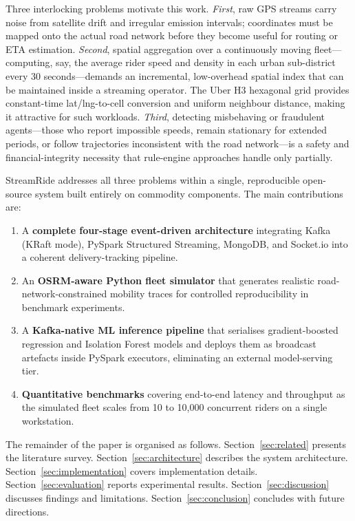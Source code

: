 \documentclass[conference]{IEEEtran}
\begin{document}
Three interlocking problems motivate this work. \textit{First},
raw GPS streams carry noise from satellite drift and irregular
emission intervals; coordinates must be mapped onto the actual road
network before they become useful for routing or ETA estimation.
\textit{Second}, spatial aggregation over a continuously moving
fleet—computing, say, the average rider speed and density in each
urban sub-district every 30 seconds—demands an incremental,
low-overhead spatial index that can be maintained inside a
streaming operator. The Uber H3 hexagonal grid provides constant-time
lat/lng-to-cell conversion and uniform neighbour distance, making
it attractive for such workloads. \textit{Third}, detecting
misbehaving or fraudulent agents—those who report impossible
speeds, remain stationary for extended periods, or follow
trajectories inconsistent with the road network—is a safety and
financial-integrity necessity that rule-engine approaches handle
only partially.

StreamRide addresses all three problems within a single, reproducible
open-source system built entirely on commodity components. The main
contributions are:

\begin{enumerate}
  \item A \textbf{complete four-stage event-driven architecture}
        integrating Kafka (KRaft mode), PySpark Structured Streaming,
        MongoDB, and Socket.io into a coherent delivery-tracking pipeline.
  \item An \textbf{OSRM-aware Python fleet simulator} that generates
        realistic road-network-constrained mobility traces for controlled
        reproducibility in benchmark experiments.
  \item A \textbf{Kafka-native ML inference pipeline} that serialises
        gradient-boosted regression and Isolation Forest models and
        deploys them as broadcast artefacts inside PySpark executors,
        eliminating an external model-serving tier.
  \item \textbf{Quantitative benchmarks} covering end-to-end latency and
        throughput as the simulated fleet scales from 10 to 10,000
        concurrent riders on a single workstation.
\end{enumerate}

The remainder of the paper is organised as follows.
Section~\ref{sec:related} presents the literature survey.
Section~\ref{sec:architecture} describes the system architecture.
Section~\ref{sec:implementation} covers implementation details.
Section~\ref{sec:evaluation} reports experimental results.
Section~\ref{sec:discussion} discusses findings and limitations.
Section~\ref{sec:conclusion} concludes with future directions.
\end{document}
